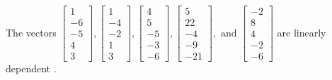 \begin{exercise}
\begin{exerciseStatement}
  \end{exerciseStatement}
  \begin{exerciseAnswer}
   The vectors \(\left[\begin{array}{r}
1 \\
-6 \\
-5 \\
4 \\
3
\end{array}\right] , \left[\begin{array}{r}
1 \\
-4 \\
-2 \\
1 \\
3
\end{array}\right] , \left[\begin{array}{r}
4 \\
5 \\
-5 \\
-3 \\
-6
\end{array}\right] , \left[\begin{array}{r}
5 \\
22 \\
-4 \\
-9 \\
-21
\end{array}\right] , \text{ and } \left[\begin{array}{r}
-2 \\
8 \\
4 \\
-2 \\
-6
\end{array}\right]\) are 
  	 linearly dependent  .
  


  \end{exerciseAnswer}
\end{exercise}